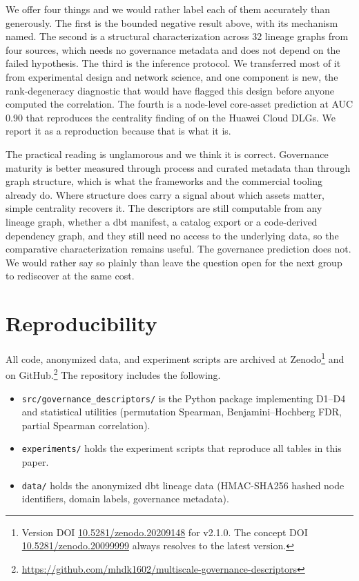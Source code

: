 \documentclass[11pt,a4paper]{article}
\begin{document}
We offer four things and we would rather label each of them accurately
than generously. The first is the bounded negative result above, with
its mechanism named. The second is a structural characterization across
32 lineage graphs from four sources, which needs no governance metadata
and does not depend on the failed hypothesis. The third is the inference
protocol. We transferred most of it from experimental design and network
science, and one component is new, the rank-degeneracy diagnostic that
would have flagged this design before anyone computed the correlation.
The fourth is a node-level core-asset prediction at AUC 0.90 that
reproduces the centrality finding of \citet{chen2023centrality} on the
Huawei Cloud DLGs. We report it as a reproduction because that is what
it is.

The practical reading is unglamorous and we think it is correct.
Governance maturity is better measured through process and curated
metadata than through graph structure, which is what the frameworks and
the commercial tooling already do. Where structure does carry a signal
about which assets matter, simple centrality recovers it. The
descriptors are still computable from any lineage graph, whether a dbt
manifest, a catalog export or a code-derived dependency graph, and they
still need no access to the underlying data, so the comparative
characterization remains useful. The governance prediction does not. We
would rather say so plainly than leave the question open for the next
group to rediscover at the same cost.

\appendix

\section{Reproducibility}

All code, anonymized data, and experiment scripts are archived at
Zenodo\footnote{Version DOI \href{https://doi.org/10.5281/zenodo.20209148}{10.5281/zenodo.20209148} for v2.1.0. The concept DOI \href{https://doi.org/10.5281/zenodo.20099999}{10.5281/zenodo.20099999} always resolves to the latest version.}
and on GitHub.\footnote{\url{https://github.com/mhdk1602/multiscale-governance-descriptors}}
The repository includes the following.

\begin{itemize}
  \item \texttt{src/governance\_descriptors/} is the Python package implementing
        D1--D4 and statistical utilities (permutation Spearman,
        Benjamini--Hochberg FDR, partial Spearman correlation).
  \item \texttt{experiments/} holds the experiment scripts that reproduce
        all tables in this paper.
  \item \texttt{data/} holds the anonymized dbt lineage data (HMAC-SHA256
        hashed node identifiers, domain labels, governance metadata).
\end{itemize}
\end{document}

